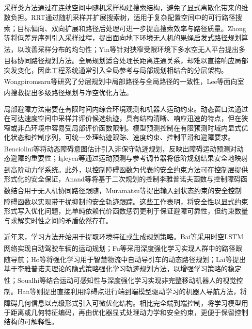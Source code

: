 采样类方法通过在连续空间中随机采样构建搜索结构，避免了显式离散化带来的维数负担。RRT通过随机采样并扩展搜索树，适用于复杂配置空间中的可行路径搜索\textsuperscript{\cite{LaValle1998RRT}}；目标偏向、双向扩展和路径后处理可进一步提高搜索效率与路径质量。Zhong等将低差异序列引入采样过程，提出面向地下环境无人机的果蝇启发式路径规划算法，以改善采样分布的均匀性\textsuperscript{\cite{ZHONG2025111250}}；Yin等针对狭窄受限环境下多水空无人平台提出多目标协同路径规划方法\textsuperscript{\cite{YIN2025128625}}。全局规划适合处理长距离连通关系，却难以直接响应局部突发变化，因此工程系统通常引入全局参考与局部规划相结合的分层架构。Wongpiromsarn等研究了分层规划中局部路径与全局路径的一致性\textsuperscript{\cite{10598326}}，Lee等面向室内搜救提出多级路径规划与净空优化方法\textsuperscript{\cite{10107604}}。

局部避障方法需要在有限时间内综合环境观测和机器人运动约束。动态窗口法通过在可达速度空间中采样并评价候选轨迹，具有结构清晰、响应迅速的特点，但在狭窄或非凸环境中容易受局部评价函数限制。模型预测控制在有限预测时域内显式优化状态和控制序列，可统一处理轨迹跟踪、速度约束、控制平滑和避障要求。Benciolini等将动态障碍意图估计引入非保守轨迹规划\textsuperscript{\cite{10005857}}，反映出障碍运动预测对动态避障的重要性；İşleyen等通过运动预测与参考调节器将低阶规划结果安全地映射到高阶动力学系统\textsuperscript{\cite{9832477}}。此外，以控制障碍函数为代表的安全约束方法可在控制层提供形式化的安全保证，Anand等将基于二次规划的控制李雅普诺夫函数与控制障碍函数结合用于无人机协同路径跟随\textsuperscript{\cite{10886491}}，Muramatsu等提出输入到状态约束的安全控制障碍函数以实现带干扰抑制的安全轨迹跟踪\textsuperscript{\cite{MURAMATSU2024114}}。这些工作表明，将安全性以显式约束形式写入优化问题，比单纯依赖代价函数惩罚更利于保证避障可靠性，但约束数量与求解实时性之间的矛盾依然存在。

近年来，学习方法开始用于提取环境特征或生成规划策略。Bai等采用时空LSTM网络实现自动驾驶车辆的运动规划\textsuperscript{\cite{8623233}}；Fu等采用深度强化学习实现人群中的路径跟随导航\textsuperscript{\cite{10445747}}；Ho等将强化学习用于智慧物流中自动导引车的动态路径规划\textsuperscript{\cite{HO2025104008}}；Lai等提出基于李雅普诺夫理论的隐式策略强化学习轨迹规划方法，以增强学习策略的稳定性\textsuperscript{\cite{LAI2025113870}}；Soualhi等结合运动可感知性与深度强化学习实现非完整移动机器人的视觉控制\textsuperscript{\cite{SOUALHI2025104920}}。Han等则提出直接利用障碍点进行端到端模型驱动学习的机器人导航方法，将障碍几何信息以点级形式引入可微优化结构\textsuperscript{\cite{han2025directpoint}}。相比完全端到端控制，将学习模型用于距离或几何特征编码，再由优化器显式处理动力学和安全约束，更便于保留控制结构的可解释性。

